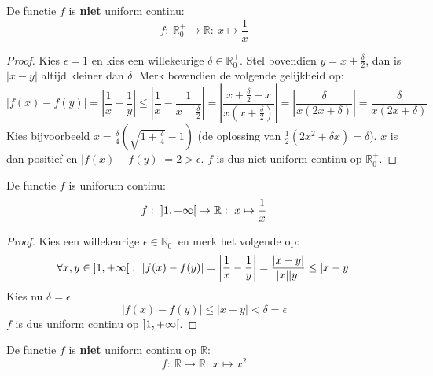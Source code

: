 \documentclass[main.tex]{subfiles}
\begin{document}
\begin{tvb}
  De functie $f$ is \textbf{niet} uniform continu:
  \[ f:\ \mathbb{R}_{0}^{+} \rightarrow \mathbb{R}:\ x \mapsto \frac{1}{x} \]

  \begin{proof}
    Kies $\epsilon = 1$ en kies een willekeurige $\delta \in \mathbb{R}_{0}^{+}$.
    Stel bovendien $y = x + \frac{\delta}{2}$, dan is $|x-y|$ altijd kleiner dan $\delta$.
    Merk bovendien de volgende gelijkheid op:
    \[ |f(x)-f(y)| = \left| \frac{1}{x} - \frac{1}{y} \right| \le \left| \frac{1}{x} - \frac{1}{x + \frac{\delta}{2}} \right| = \left| \frac{x+\frac{\delta}{2}-x}{x(x+\frac{\delta}{2})}\right| = \left| \frac{\delta}{x(2x+\delta)} \right| = \frac{\delta}{x(2x+\delta)} \]
    Kies bijvoorbeeld $x = \frac{\delta}{4}\left(\sqrt{1+\frac{\delta}{4}}-1\right)$ (de oplossing van $\frac{1}{2}(2x^{2}+\delta x) = \delta$).
    $x$ is dan positief en $|f(x)-f(y)| = 2 > \epsilon$.
    $f$ is dus niet uniform continu op $\mathbb{R}_{0}^{+}$.
  \end{proof}
\end{tvb}

\begin{vb}
  De functie $f$ is uniforum continu:
  \[ f:\ \interval[open]{1}{+\infty} \rightarrow \mathbb{R}:\ x \mapsto \frac{1}{x} \]
    \begin{figure}[H]
      \centering
    \end{figure}

    \begin{proof}
      Kies een willekeurige $\epsilon \in \mathbb{R}_{0}^{+}$ en merk het volgende op:
      \[ \forall x,y \in \interval[open]{1}{+\infty}:\ |f(x)-f(y)| = \left|\frac{1}{x}- \frac{1}{y}\right| = \frac{|x-y|}{|x||y|} \le |x-y| \]
      Kies nu $\delta = \epsilon$.
      \[ |f(x)-f(y)| \le |x-y| < \delta = \epsilon \]
      $f$ is dus uniform continu op $\interval[open]{1}{+\infty}$.
    \end{proof}
\end{vb}


\begin{tvb}
  De functie $f$ is \textbf{niet} uniform continu op $\mathbb{R}$:
  \[ f:\ \mathbb{R} \rightarrow \mathbb{R}:\ x \mapsto x^{2}\]
\end{tvb}
\end{document}
